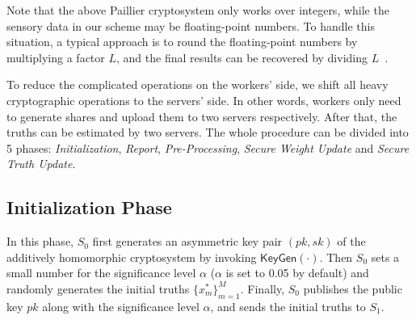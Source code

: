\documentclass[conference]{IEEEtran}
\begin{document}
Note that the above Paillier cryptosystem only works over integers, while the sensory data in our scheme may be floating-point numbers.
To handle this situation, a typical approach is to round the floating-point numbers by multiplying a factor $L$, and the final results can be recovered by dividing $L$~\cite{zheng_learning_2018,xue_inpptd_2020}.

To reduce the complicated operations on the workers' side, we shift all heavy cryptographic operations to the servers' side.
In other words, workers only need to generate shares and upload them to two servers respectively.
After that, the truths can be estimated by two servers.
The whole procedure can be divided into 5 phases: {\em Initialization}, {\em Report}, {\em Pre-Processing}, {\em Secure Weight Update} and {\em Secure Truth Update}.

\subsection{Initialization Phase}
In this phase, $S_0$ first generates an asymmetric key pair $(pk, sk)$ of the additively homomorphic cryptosystem by invoking $\mathsf{KeyGen}(\cdot)$.
Then $S_0$ sets a small number for the signiﬁcance level $\alpha$ ($\alpha$ is set to 0.05 by default) and randomly generates the initial truths $\{x_m^*\}_{m=1}^M$.
Finally, $S_0$ publishes the public key $pk$ along with the signiﬁcance level $\alpha$, and sends the initial truths to $S_1$.
\end{document}
